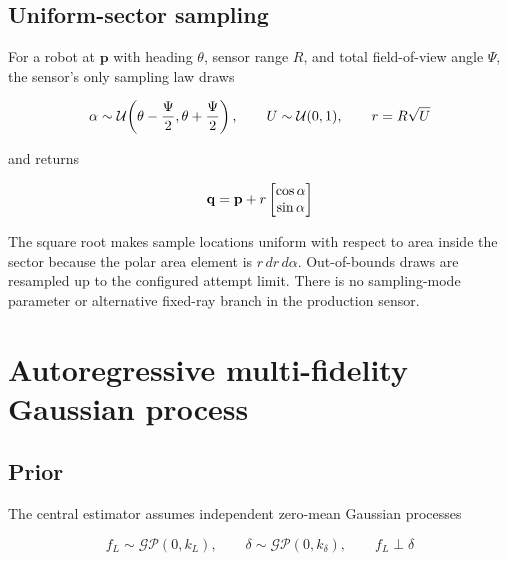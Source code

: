 \documentclass[11pt]{article}
\begin{document}
\subsection{Uniform-sector sampling}


For a robot at $\mathbf p$ with heading $\theta$, sensor range $R$, and total field-of-view angle $\Psi$, the sensor's only sampling law draws


\begin{equation}
\alpha\sim \\
\mathcal U\!\left(\theta-\frac{\Psi}{2}, \\
\theta+\frac{\Psi}{2}\right),
\qquad
U\sim\mathcal U(0,1),
\qquad
r=R\sqrt{U}
\end{equation}


and returns


\begin{equation}
\mathbf q \\
= \\
\mathbf p+ \\
r \\
\begin{bmatrix}
\cos\alpha\\
\sin\alpha \\
\end{bmatrix}
\end{equation}


The square root makes sample locations uniform with respect to area inside the sector because the polar area element is $r\,dr\,d\alpha$. Out-of-bounds draws are resampled up to the configured attempt limit. There is no sampling-mode parameter or alternative fixed-ray branch in the production sensor.


\section{Autoregressive multi-fidelity Gaussian process}


\subsection{Prior}


The central estimator assumes independent zero-mean Gaussian processes


\begin{equation}
f_L\sim\mathcal{GP}(0,k_L),
\qquad
\delta\sim\mathcal{GP}(0,k_\delta),
\qquad
f_L\perp\delta
\end{equation}
\end{document}
